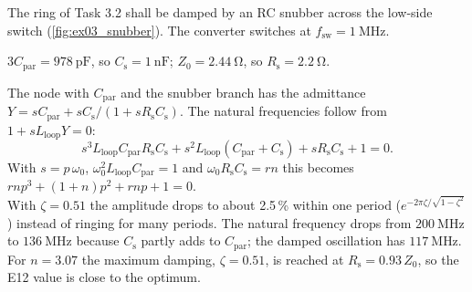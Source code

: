 

The ring of Task 3.2 shall be damped by an RC snubber across the low-side switch (\autoref{fig:ex03_snubber}). The converter switches at $f_\mathrm{sw}=\SI{1}{\mega\hertz}$.




\begin{solutionblock}
	$3C_\mathrm{par}=\SI{978}{\pico\farad}$, so $C_\mathrm{s}=\SI{1}{\nano\farad}$; $Z_0=\SI{2.44}{\ohm}$, so $R_\mathrm{s}=\SI{2.2}{\ohm}$.
\end{solutionblock}


\begin{solutionblock}
	The node with $C_\mathrm{par}$ and the snubber branch has the admittance $Y=sC_\mathrm{par}+sC_\mathrm{s}/(1+sR_\mathrm{s}C_\mathrm{s})$. The natural frequencies follow from $1+sL_\mathrm{loop}Y=0$:
	\begin{equation}
		s^3L_\mathrm{loop}C_\mathrm{par}R_\mathrm{s}C_\mathrm{s}+s^2L_\mathrm{loop}(C_\mathrm{par}+C_\mathrm{s})+sR_\mathrm{s}C_\mathrm{s}+1=0.
	\end{equation}
	With $s=p\,\omega_0$, $\omega_0^2L_\mathrm{loop}C_\mathrm{par}=1$ and $\omega_0R_\mathrm{s}C_\mathrm{s}=rn$ this becomes $rnp^3+(1+n)p^2+rnp+1=0$.\\
	With $\zeta=0.51$ the amplitude drops to about 2.5\,\% within one period ($e^{-2\pi\zeta/\sqrt{1-\zeta^2}}$) instead of ringing for many periods. The natural frequency drops from $\SI{200}{\mega\hertz}$ to $\SI{136}{\mega\hertz}$ because $C_\mathrm{s}$ partly adds to $C_\mathrm{par}$; the damped oscillation has $\SI{117}{\mega\hertz}$. For $n=3.07$ the maximum damping, $\zeta=0.51$, is reached at $R_\mathrm{s}=0.93\,Z_0$, so the E12 value is close to the optimum.
\end{solutionblock}

